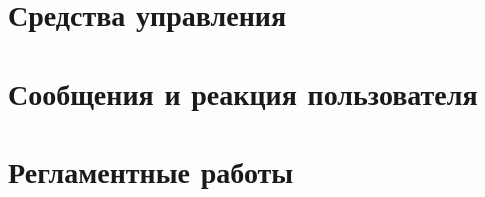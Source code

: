 \section{Средства управления}

\section{Сообщения и реакция пользователя} %

\section{Регламентные работы} %